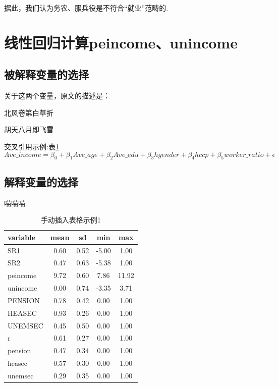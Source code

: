 \documentclass[a4paper,12pt]{report}
\begin{document}
据此，我们认为务农、服兵役是不符合“就业”范畴的.


\section{线性回归计算peincome、unincome}
\subsection{被解释变量的选择}
关于这两个变量，原文的描述是：
\lipsum[2]

北风卷第白草折

胡天八月即飞雪

交叉引用示例:表\ref{hhh}
\[
    Ave\_income = \beta_0 + \beta_{1}Ave\_age + \beta_{2}Ave\_edu + \beta_{3}hgender + \beta_{4}hccp + \beta_{5}worker\_ratio + \epsilon
\]


\subsection{解释变量的选择}
喵喵喵
\begin{table}
    \caption{手动插入表格示例1}
    \centering
    \begin{tabular}{lcccc}
        \toprule[1.5pt]
        variable & mean & sd   & min   & max   \\
        \midrule[1.0pt]
        SR1      & 0.60 & 0.52 & -5.00 & 1.00  \\
        SR2      & 0.47 & 0.63 & -5.38 & 1.00  \\
        peincome & 9.72 & 0.60 & 7.86  & 11.92 \\
        unincome & 0.00 & 0.74 & -3.35 & 3.71  \\
        PENSION  & 0.78 & 0.42 & 0.00  & 1.00  \\
        HEASEC   & 0.93 & 0.26 & 0.00  & 1.00  \\
        UNEMSEC  & 0.45 & 0.50 & 0.00  & 1.00  \\
        r        & 0.61 & 0.27 & 0.00  & 1.00  \\
        pension  & 0.47 & 0.34 & 0.00  & 1.00  \\
        heasec   & 0.57 & 0.30 & 0.00  & 1.00  \\
        unemsec  & 0.29 & 0.35 & 0.00  & 1.00  \\
        \bottomrule[1.5pt]
    \end{tabular}
    \label{hhh}
\end{table}
\end{document}
